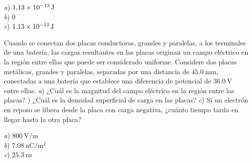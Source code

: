 \begin{Answer}
	\begin{minipage}[t]{.4\textwidth}
    \textit{a}) $\SI{1.13E-13}{\joule}$\\ \textit{b}) 0\\ \textit{c}) $\SI{1.13E-13}{\joule}$
  \end{minipage}
\end{Answer}
%
\begin{center}
\end{center}
%
\begin{Exercise}
  Cuando se conectan dos placas conductoras, grandes y paralelas, a los terminales de una batería, las cargas resultantes en las placas originan un campo eléctrico en la región entre ellas que puede ser considerado uniforme. Considere dos placas metálicas, grandes y paralelas, separadas por una distancia de $\SI{45.0}{\milli\metre}$, conectadas a una batería que establece una diferencia de potencial de $\SI{36.0}{\volt}$ entre ellas. \textit{a}) ¿Cuál es la magnitud del campo eléctrico en la región entre las placas? ) ¿Cuál es la densidad superficial de carga en las placas? \textit{c}) Si un electrón en reposo se libera desde la placa con carga negativa, ¿cuánto tiempo tarda en llegar hasta la otra placa?
\end{Exercise}
\begin{Answer}
	\begin{minipage}[t]{.4\textwidth}
    \textit{a}) $\SI{800}{\volt/\metre}$\\ \textit{b}) $\SI{7.08}{\nano\coulomb/\metre\squared}$\\ \textit{c}) $\SI{25.3}{\nano\second}$
  \end{minipage}
\end{Answer}
